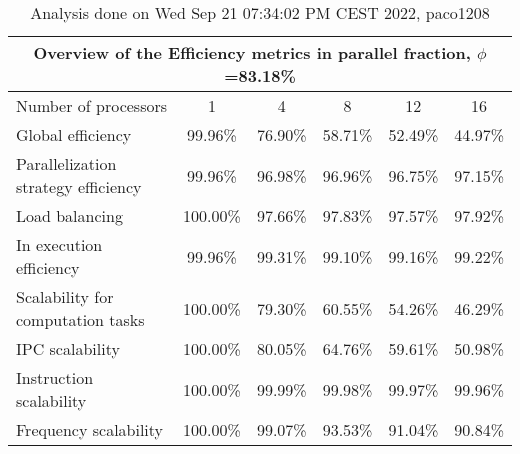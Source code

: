 \begin{table}[h]
\begin{center}
\begin{tabular}{|l|c|c|c|c|c|}
\hline
\multicolumn{6}{|c|}{Overview of the Efficiency metrics in parallel fraction, $\phi$=83.18\%} \\
\hline
\hline
Number of processors & 1 & 4 & 8 & 12 & 16 \\
\hline
\hline
Global efficiency                      &     99.96\% &     76.90\% &     58.71\% &     52.49\% &     44.97\% \\
\hline
\hline
Parallelization strategy efficiency &     99.96\% &     96.98\% &     96.96\% &     96.75\% &     97.15\% \\
\hline
Load balancing                   &    100.00\% &     97.66\% &     97.83\% &     97.57\% &     97.92\% \\
In execution efficiency          &     99.96\% &     99.31\% &     99.10\% &     99.16\% &     99.22\% \\
\hline
\hline
Scalability for computation tasks   &    100.00\% &     79.30\% &     60.55\% &     54.26\% &     46.29\% \\
\hline
IPC scalability                  &    100.00\% &     80.05\% &     64.76\% &     59.61\% &     50.98\% \\
Instruction scalability          &    100.00\% &     99.99\% &     99.98\% &     99.97\% &     99.96\% \\
Frequency scalability            &    100.00\% &     99.07\% &     93.53\% &     91.04\% &     90.84\% \\
\hline
\end{tabular}
\end{center}
\caption{ Analysis done on Wed Sep 21 07:34:02 PM CEST 2022, paco1208}
\end{table}
